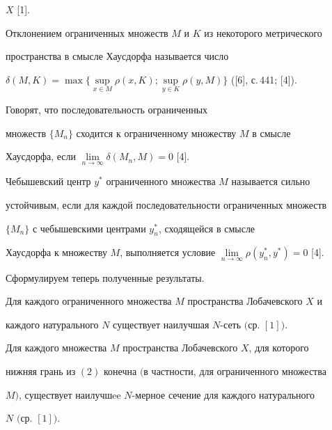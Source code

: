 $X$ [1]. 





Отклонением ограниченных множеств $M$ и $K$ из некоторого метрического


пространства в смысле Хаусдорфа называется число


$\delta (M,K) =


\max\{\sup\limits_{x \in M}{\rho(x,K)};\sup\limits_{y \in


K}{\rho(y,M)}\}$ ([6], с.\,441; [4]).





Говорят, что последовательность ограниченных


множеств $\{M_{n}\}$ сходится к ограниченному множеству $M$ в смысле


Хаусдорфа, если $\lim\limits_{n \to \infty}{\delta (M_{n},M)} =0$ [4].





Чебышевский центр $y^{*}$ ограниченного множества $M$ называется сильно


устойчивым, если для каждой последовательности ограниченных множеств


$\{M_{n}\}$ с чебышевскими центрами $y^{*}_{n}$, сходящейся в смысле


Хаусдорфа к множеству $M$, выполняется условие $\lim\limits_{n \to


\infty}{\rho(y^{*}_{n},y^{*})} =0$ [4]. 


 


Сформулируем теперь полученные результаты. 





\begin{thm}


Для каждого ограниченного множества $M$ пространства Лобачевского $X$ и


каждого натурального $N$ существует наилучшая $N$-сеть $($ср. $[1])$.


\end{thm}





\begin{thm}


Для каждого множества $M$ пространства Лобачевского $X$, для которого


нижняя грань из $(2)$ конечна $($в частности, для ограниченного множества


$M)$, существует наилучшee $N$-мерное сечение для каждого натурального


$N$ $($ср. $[1])$.


\end{thm}





